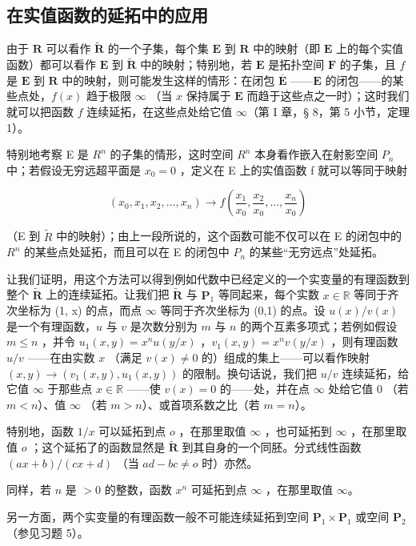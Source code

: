 \subsection{在实值函数的延拓中的应用}

由于 \(\mathbf{R}\) 可以看作 \(\tilde{\mathbf{R}}\) 的一个子集，每个集 \(\mathbf{E}\) 到 \(\mathbf{R}\) 中的映射（即 \(\mathbf{E}\) 上的每个实值函数）都可以看作 \(\mathbf{E}\) 到 \(\tilde{\mathbf{R}}\) 中的映射；特别地，若 \(\mathbf{E}\) 是拓扑空间 \(\mathbf{F}\) 的子集，且 \(f\) 是 \(\mathbf{E}\) 到 \(\mathbf{R}\) 中的映射，则可能发生这样的情形：在闭包 \(\overline{\mathbf{E}}\) ——\(\mathbf{E}\) 的闭包——的某些点处，\(f(x)\) 趋于极限 \(\infty\) （当 \(x\) 保持属于 \(\mathbf{E}\) 而趋于这些点之一时）；这时我们就可以把函数 \(f\) 连续延拓，在这些点处给它值 \(\infty\)（第 I 章，§ 8，第 5 小节，定理 1）。

特别地考察 E 是 \(R^{n}\) 的子集的情形，这时空间 \(R^{n}\) 本身看作嵌入在射影空间 \(P_{n}\) 中；若假设无穷远超平面是 \(x_{0}=0\) ，定义在 E 上的实值函数 f 就可以等同于映射

\[
(x _ {0}, x _ {1}, x _ {2}, \ldots , x _ {n}) \rightarrow f \left(\frac {x _ {1}}{x _ {0}}, \frac {x _ {2}}{x _ {0}}, \ldots , \frac {x _ {n}}{x _ {0}}\right)
\]

（E 到 \(\tilde{R}\) 中的映射）；由上一段所说的，这个函数可能不仅可以在 E 的闭包中的 \(R^{n}\) 的某些点处延拓，而且可以在 E 的闭包中 \(P_{n}\) 的某些“无穷远点”处延拓。

让我们证明，用这个方法可以得到例如代数中已经定义的一个实变量的有理函数到整个 \(\tilde{\mathbf{R}}\) 上的连续延拓。让我们把 \(\tilde{\mathbf{R}}\) 与 \(\mathbf{P}_1\) 等同起来，每个实数 \(x \in \mathbb{R}\) 等同于齐次坐标为 (1, x) 的点，而点 \(\infty\) 等同于齐次坐标为 (0,1) 的点。设 \(u(x)/v(x)\) 是一个有理函数，\(u\) 与 \(v\) 是次数分别为 \(m\) 与 \(n\) 的两个互素多项式；若例如假设 \(m \leqslant n\) ，并令 \(u_1(x,y) = x^n u(y/x)\) ，\(v_1(x,y) = x^n v(y/x)\) ，则有理函数 \(u/v\) ——在由实数 \(x\) （满足 \(v(x) \neq 0\) 的）组成的集上——可以看作映射 \((x,y) \to (v_1(x,y), u_1(x,y))\) 的限制。换句话说，我们把 \(u/v\) 连续延拓，给它值 \(\infty\) 于那些点 \(x \in \mathbb{R}\) ——使 \(v(x) = 0\) 的——处，并在点 \(\infty\) 处给它值 \(0\) （若 \(m < n\)）、值 \(\infty\) （若 \(m > n\)）、或首项系数之比（若 \(m = n\)）。

特别地，函数 \(1 / x\) 可以延拓到点 \(o\) ，在那里取值 \(\infty\) ，也可延拓到 \(\infty\) ，在那里取值 \(o\) ；这个延拓了的函数显然是 \(\tilde{\mathbf{R}}\) 到其自身的一个同胚。分式线性函数 \((ax + b) / (cx + d)\) （当 \(ad - bc \neq o\) 时）亦然。

同样，若 \(n\) 是 \(> 0\) 的整数，函数 \(x^n\) 可延拓到点 \(\infty\) ，在那里取值 \(\infty\)。

另一方面，两个实变量的有理函数一般不可能连续延拓到空间 \(\mathbf{P}_1 \times \mathbf{P}_1\) 或空间 \(\mathbf{P}_2\)（参见习题 5）。


